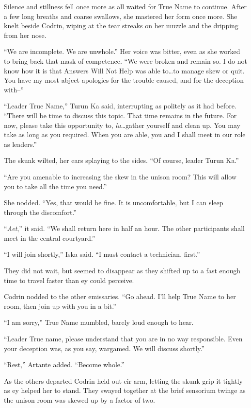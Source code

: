 Silence and stillness fell once more as all waited for True Name to continue. After a few long breaths and coarse swallows, she mastered her form once more. She knelt beside Codrin, wiping at the tear streaks on her muzzle and the dripping from her nose.

``We are incomplete. We are unwhole.'' Her voice was bitter, even as she worked to bring back that mask of competence. ``We were broken and remain so. I do not know how it is that Answers Will Not Help was able to\ldots to manage skew or quit. You have my most abject apologies for the trouble caused, and for the deception with--''

``Leader True Name,'' Turun Ka said, interrupting as politely as it had before. ``There will be time to discuss this topic. That time remains in the future. For now, please take this opportunity to, \emph{lu}\ldots gather yourself and clean up. You may take as long as you required. When you are able, you and I shall meet in our role as leaders.''

The skunk wilted, her ears splaying to the sides. ``Of course, leader Turun Ka.''

``Are you amenable to increasing the skew in the unison room? This will allow you to take all the time you need.''

She nodded. ``Yes, that would be fine. It is uncomfortable, but I can sleep through the discomfort.''

``\emph{Aet},'' it said. ``We shall return here in half an hour. The other participants shall meet in the central courtyard.''

``I will join shortly,'' Iska said. ``I must contact a technician, first.''

They did not wait, but seemed to disappear as they shifted up to a fast enough time to travel faster than ey could perceive.

Codrin nodded to the other emissaries. ``Go ahead. I'll help True Name to her room, then join up with you in a bit.''

``I am sorry,'' True Name mumbled, barely loud enough to hear.

``Leader True name, please understand that you are in no way responsible. Even your deception was, as you say, wargamed. We will discuss shortly.''

``Rest,'' Artante added. ``Become whole.''

As the others departed Codrin held out eir arm, letting the skunk grip it tightly as ey helped her to stand. They swayed together at the brief sensorium twinge as the unison room was skewed up by a factor of two.

